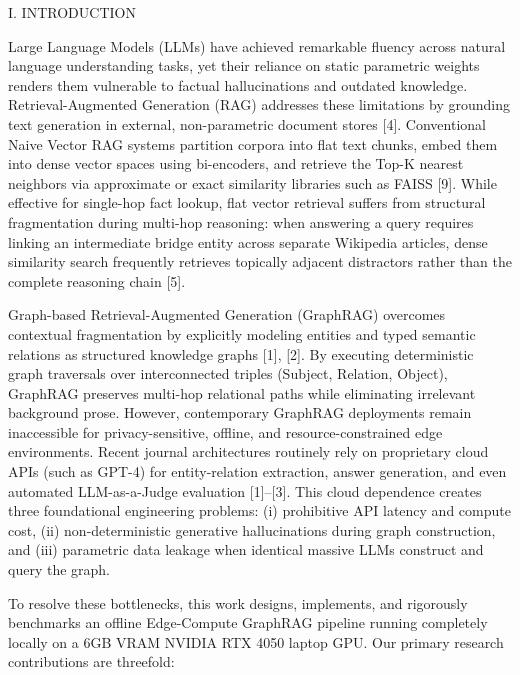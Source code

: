 \textsc{I. INTRODUCTION}

Large Language Models (LLMs) have achieved remarkable fluency across
natural language understanding tasks, yet their reliance on static
parametric weights renders them vulnerable to factual hallucinations and
outdated knowledge. Retrieval-Augmented Generation (RAG) addresses these
limitations by grounding text generation in external, non-parametric
document stores {[}4{]}. Conventional Naive Vector RAG systems partition
corpora into flat text chunks, embed them into dense vector spaces using
bi-encoders, and retrieve the Top-K nearest neighbors via approximate or
exact similarity libraries such as FAISS {[}9{]}. While effective for
single-hop fact lookup, flat vector retrieval suffers from structural
fragmentation during multi-hop reasoning: when answering a query
requires linking an intermediate bridge entity across separate Wikipedia
articles, dense similarity search frequently retrieves topically
adjacent distractors rather than the complete reasoning chain {[}5{]}.

Graph-based Retrieval-Augmented Generation (GraphRAG) overcomes
contextual fragmentation by explicitly modeling entities and typed
semantic relations as structured knowledge graphs {[}1{]}, {[}2{]}. By
executing deterministic graph traversals over interconnected triples
(Subject, Relation, Object), GraphRAG preserves multi-hop relational
paths while eliminating irrelevant background prose. However,
contemporary GraphRAG deployments remain inaccessible for
privacy-sensitive, offline, and resource-constrained edge environments.
Recent journal architectures routinely rely on proprietary cloud APIs
(such as GPT-4) for entity-relation extraction, answer generation, and
even automated LLM-as-a-Judge evaluation {[}1{]}--{[}3{]}. This cloud
dependence creates three foundational engineering problems: (i)
prohibitive API latency and compute cost, (ii) non-deterministic
generative hallucinations during graph construction, and (iii)
parametric data leakage when identical massive LLMs construct and query
the graph.

To resolve these bottlenecks, this work designs, implements, and
rigorously benchmarks an offline Edge-Compute GraphRAG pipeline running
completely locally on a 6GB VRAM NVIDIA RTX 4050 laptop GPU. Our primary
research contributions are threefold:

